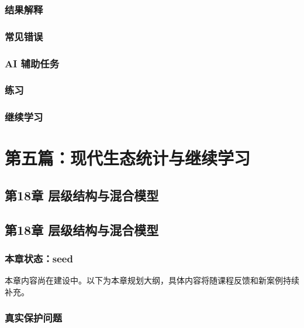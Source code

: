 \documentclass[
  letterpaper,
]{scrbook}
\begin{document}
\section{结果解释}\label{ux7ed3ux679cux89e3ux91ca-6}

\section{常见错误}\label{ux5e38ux89c1ux9519ux8bef-14}

\section{AI 辅助任务}\label{ai-ux8f85ux52a9ux4efbux52a1-7}

\section{练习}\label{ux7ec3ux4e60-16}

\section{继续学习}\label{ux7ee7ux7eedux5b66ux4e60-7}

\part{第五篇：现代生态统计与继续学习}

\chapter{第18章
层级结构与混合模型}\label{ux7b2c18ux7ae0-ux5c42ux7ea7ux7ed3ux6784ux4e0eux6df7ux5408ux6a21ux578b}

\chapter{第18章
层级结构与混合模型}\label{ux7b2c18ux7ae0-ux5c42ux7ea7ux7ed3ux6784ux4e0eux6df7ux5408ux6a21ux578b-1}

\section{本章状态：seed}\label{ux672cux7ae0ux72b6ux6001seed-7}

本章内容尚在建设中。以下为本章规划大纲，具体内容将随课程反馈和新案例持续补充。

\section{真实保护问题}\label{ux771fux5b9eux4fddux62a4ux95eeux9898-14}
\end{document}
